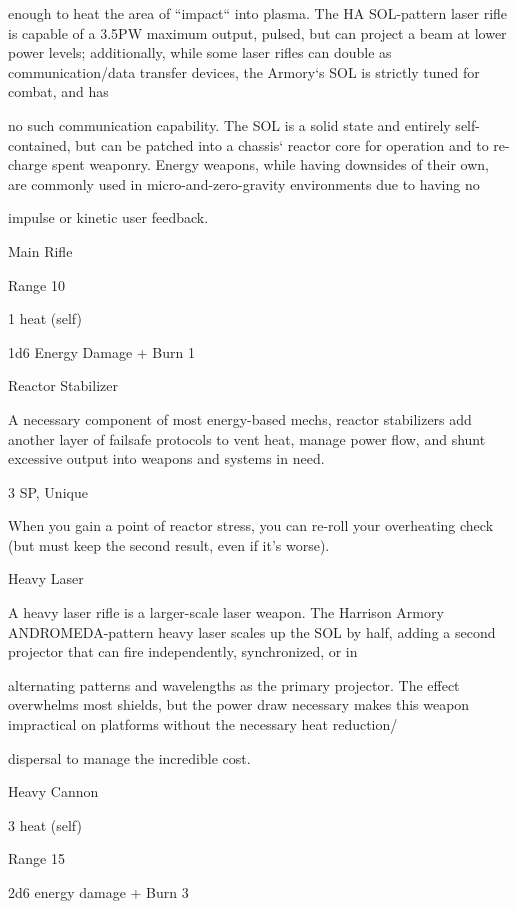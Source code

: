 enough to heat the area of “impact“ into plasma. The HA SOL-pattern laser rifle is capable of a 3.5PW  
maximum output, pulsed, but can project a beam at lower power levels; additionally, while some laser rifles  
can double as communication/data transfer devices, the Armory‘s SOL is strictly tuned for combat, and has  

no such communication capability. The SOL is a solid state and entirely self-contained, but can be patched  
into a chassis‘ reactor core for operation and to re-charge spent weaponry. Energy weapons, while having  
downsides of their own, are commonly used in micro-and-zero-gravity environments due to having no  

impulse or kinetic user feedback.   

Main Rifle
 
Range 10
 
1 heat (self)
 
1d6 Energy Damage + Burn 1
 

Reactor Stabilizer  

A necessary component of most energy-based mechs, reactor stabilizers add another layer of failsafe  
protocols to vent heat, manage power flow, and shunt excessive output into weapons and systems in need.   

3 SP, Unique  

                                                                                                                 


When you gain a point of reactor stress, you can re-roll your overheating check (but must keep  
the second result, even if it’s worse).
 

Heavy Laser  

A heavy laser rifle is a larger-scale laser weapon. The Harrison Armory ANDROMEDA-pattern heavy laser  
scales up the SOL by half, adding a second projector that can fire independently, synchronized, or in  

alternating patterns and wavelengths as the primary projector. The effect overwhelms most shields, but the  
power draw necessary makes this weapon impractical on platforms without the necessary heat reduction/  

dispersal to manage the incredible cost.   

Heavy Cannon
 
3 heat (self)
 
Range 15
 
2d6 energy damage + Burn 3
 

